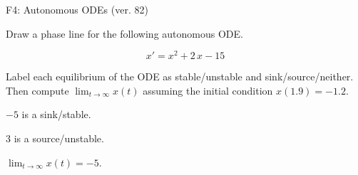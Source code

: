 \begin{exercise}
  \begin{exerciseTitle}F4: Autonomous ODEs (ver. 82)\end{exerciseTitle}
  \begin{exerciseStatement}
    

      Draw a phase line for the following 
      autonomous ODE.
    

    
\[x'= x^{2} + 2 \, x - 15\]

    

      Label each equilibrium of the ODE
      as stable/unstable and sink/source/neither.
      Then compute \(\lim_{t\to\infty}x(t)\)
      assuming the initial condition
      \(x( 1.9 )= -1.2\).
    

  \end{exerciseStatement}
  \begin{exerciseAnswer}
    

      \(-5\) is a sink/stable.
      
      \(3\) is a source/unstable.
    

    

      \(\lim_{t\to\infty}x(t)=-5\).
    

  \end{exerciseAnswer}
\end{exercise}